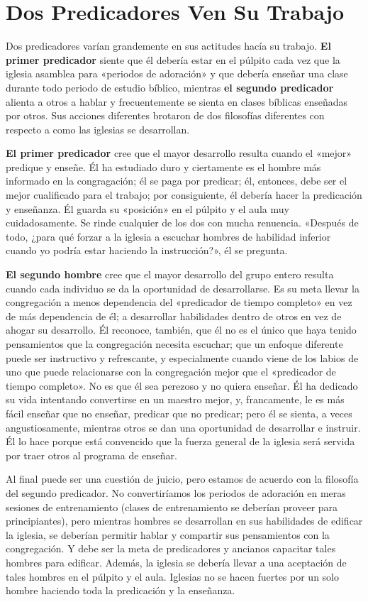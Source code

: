 \documentclass[12pt, twoside, openright]{book}
\begin{document}
\section{Dos Predicadores Ven Su Trabajo}
Dos predicadores varían grandemente en sus actitudes hacía su trabajo. \textbf{El primer predicador} siente que él debería estar en el púlpito cada vez que la iglesia asamblea para «periodos de adoración» y que debería enseñar una clase durante todo periodo de estudio bíblico, mientras \textbf{el segundo predicador} alienta a otros a hablar y frecuentemente se sienta en clases bíblicas enseñadas por otros. Sus acciones diferentes brotaron de dos filosofías diferentes con respecto a como las iglesias se desarrollan. 

\textbf{El primer predicador} cree que el mayor desarrollo resulta cuando el «mejor» predique y enseñe. Él ha estudiado duro y ciertamente es el hombre más informado en la congragación; él se paga por predicar; él, entonces, debe ser el mejor cualificado para el trabajo; por consiguiente, él debería hacer la predicación y enseñanza. Él guarda su «posición» en el púlpito y el aula muy cuidadosamente. Se rinde cualquier de los dos con mucha renuencia. «Después de todo, ¿para qué forzar a la iglesia a escuchar hombres de habilidad inferior cuando yo podría estar haciendo la instrucción?», él se pregunta. 

\textbf{El segundo hombre} cree que el mayor desarrollo del grupo entero resulta cuando cada individuo se da la oportunidad de desarrollarse. Es su meta llevar la congregación a menos dependencia del «predicador de tiempo completo» en vez de más dependencia de él; a desarrollar habilidades dentro de otros en vez de ahogar su desarrollo. Él reconoce, también, que él no es el único que haya tenido pensamientos que la congregación necesita escuchar; que un enfoque diferente puede ser instructivo y refrescante, y especialmente cuando viene de los labios de uno que puede relacionarse con la congregación mejor que el «predicador de tiempo completo». No es que él sea perezoso y no quiera enseñar. Él ha dedicado su vida intentando convertirse en un maestro mejor, y, francamente, le es más fácil enseñar que no enseñar, predicar que no predicar; pero él se sienta, a veces angustiosamente, mientras otros se dan una oportunidad de desarrollar e instruir. Él lo hace porque está convencido que la fuerza general de la iglesia será servida por traer otros al programa de enseñar. 

Al final puede ser una cuestión de juicio, pero estamos de acuerdo con la filosofía del segundo predicador. No convertiríamos los periodos de adoración en meras sesiones de entrenamiento (clases de entrenamiento se deberían proveer para principiantes), pero mientras hombres se desarrollan en sus habilidades de edificar la iglesia, se deberían permitir hablar y compartir sus pensamientos con la congregación. Y debe ser la meta de predicadores y ancianos capacitar tales hombres para edificar. Además, la iglesia se debería llevar a una aceptación de tales hombres en el púlpito y el aula. Iglesias no se hacen fuertes por un solo hombre haciendo toda la predicación y la enseñanza. 
\end{document}
